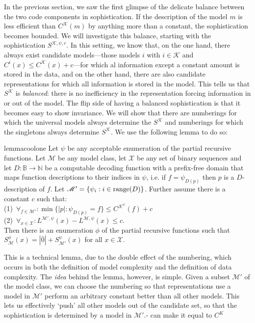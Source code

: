 \documentclass{style/llncs}
\newcommand{\M}{\mathscr M}
\newcommand{\K}{\mathscr K}
\newcommand{\X}{\mathscr X}
\newcommand{\B}{\mathbb B}
\newcommand{\N}{\mathbb N}
\newcommand{\tn}[1]{\textnormal{#1}}
\begin{document}
In the previous section, we saw the first glimpse of the delicate balance between the two code components in sophistication. If the description of the model $m$ is less efficient than $C^\K(m)$ by anything more than a constant, the sophistication becomes bounded. We will investigate this balance, starting with the sophistication $S^{\K,\psi,c}$. In this setting, we know that, on the one hand, there always exist candidate models---those models $i$ with $i \in \K$ and $C^{i}(x) \leq C^\K(x) + c$---for which al information except a constant amount is stored in the data, and on the other hand, there are also candidate representations for which all information is stored in the model. This tells us that $S^\K$ is \emph{balanced}: there is no inefficiency in the representation forcing information in or out of the model.
The flip side of having a balanced sophistication is that it becomes easy to show invariance. We will show that there are numberings for which the universal models always determine the $S^\K$ and numberings for which the singletons always determine $S^\K$. We use the following lemma to do so:
\begin{restatable}{lemma}{coolone}
\label{lemma:thecoolone}
  Let $\psi$ be any acceptable enumeration of the partial recursive functions.
  Let $\M$ be any model class, let $\X$ be any set of binary sequences and let $D:\B\to\N$ be a computable decoding function with a prefix-free domain that maps function descriptions to their indices in $\psi$, i.e. if $f=\psi_{D(p)}$ then $p$ is a $D$-description of $f$. Let $\M'=\{\psi_i:i\in\tn{range}(D)\}$. Further assume there is a constant $c$ such that:\\
\-\hspace{1cm}(1)~$\forall_{f\in\M'}:\min\{|p|:\psi_{D(p)}=f\}\le C^\K^\psi(f)+c$\\
\-\hspace{1cm}(2)~$\forall_{x\in\X}:L^{\M',\psi}(x)-L^{\M,\psi}(x)\le c$.\\
Then there is an enumeration $\phi$ of the partial recursive functions such that $S^\phi_{\M}(x) = |\bar 0|+S^\psi_{\M'}(x)$ for all $x\in\X$.
\end{restatable}

This is a technical lemma, due to the double effect of the numbering, which occurs in both the definition of model complexity and the definition of data complexity. The \emph{idea} behind the lemma, however, is simple. Given a subset $\M'$ of the model class, we can choose the numbering so that representations use a model in $\M'$ perform an arbitrary constant better than all other models. This lets us effectively `push' all other models out of the candidate set, so that the sophistication is determined by a model in $\M'$.- can make it equal to $C^K$
\end{document}
